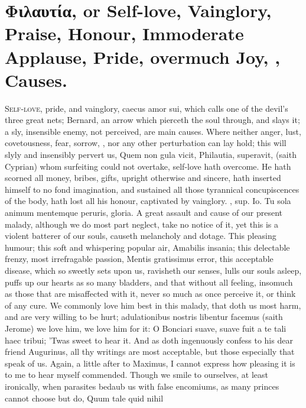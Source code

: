 {\section[\textgreek{Φιλαυτία}, or Self-love]{\textgreek{Φιλαυτία}, or Self-love, Vainglory, Praise, Honour, Immoderate Applause, Pride, overmuch Joy, \etc{}, Causes.}
\lettrine{S}{elf-love}, pride, and vainglory, caecus amor sui, which
\Chrysostom{} calls one of the devil's three great nets; Bernard, an
arrow which pierceth the soul through, and slays it; a sly, insensible
enemy, not perceived, are main causes. Where neither anger, lust,
covetousness, fear, sorrow, \etc{}, nor any other perturbation can lay
hold; this will slyly and insensibly pervert us, Quem non gula vicit,
Philautia, superavit, (saith Cyprian) whom surfeiting could not
overtake, self-love hath overcome. He hath scorned all money,
bribes, gifts, upright otherwise and sincere, hath inserted himself to
no fond imagination, and sustained all those tyrannical concupiscences
of the body, hath lost all his honour, captivated by vainglory.
\Chrysostom{}, sup. Io. Tu sola animum mentemque peruris, gloria. A great
assault and cause of our present malady, although we do most part
neglect, take no notice of it, yet this is a violent batterer of our
souls, causeth melancholy and dotage. This pleasing humour; this soft
and whispering popular air, Amabilis insania; this delectable frenzy,
most irrefragable passion, Mentis gratissimus error, this acceptable
disease, which so sweetly sets upon us, ravisheth our senses, lulls our
souls asleep, puffs up our hearts as so many bladders, and that without
all feeling, insomuch as those that are misaffected with it,
never so much as once perceive it, or think of any cure. We commonly
love him best in this malady, that doth us most harm, and are
very willing to be hurt; adulationibus nostris libentur facemus (saith
 Jerome) we love him, we love him for it: O Bonciari suave,
suave fuit a te tali haec tribui; 'Twas sweet to hear it. And as
\Pliny{} doth ingenuously confess to his dear friend Augurinus, all
thy writings are most acceptable, but those especially that speak of
us. Again, a little after to Maximus, I cannot express how
pleasing it is to me to hear myself commended. Though we smile to
ourselves, at least ironically, when parasites bedaub us with false
encomiums, as many princes cannot choose but do, Quum tale quid nihil
}
